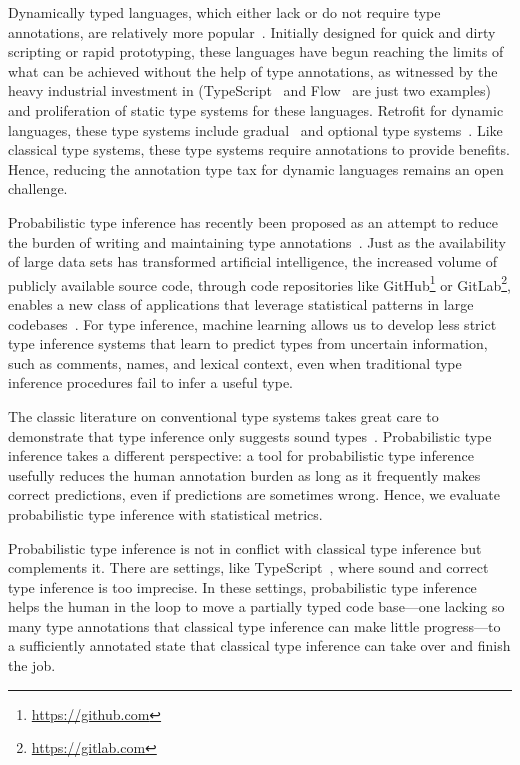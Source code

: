 \documentclass[sigplan,10pt,review,anonymous]{acmart} %
\theoremstyle{plain}
\theoremstyle{remark}
\theoremstyle{definition}
\begin{document}
Dynamically typed languages, which either lack or do not require type
annotations, are relatively more popular~\cite{meyerovich12}.  Initially
designed for quick and dirty scripting or rapid prototyping, these languages
have begun reaching the limits of what can be achieved without the help of type
annotations, as witnessed by the heavy industrial investment in
(TypeScript~\cite{typescript} and Flow~\cite{flow} are just two
examples) and proliferation of static type systems for these languages.
Retrofit for dynamic languages, these type systems include gradual~\cite{siek06}
and optional type systems~\citep{bracha2004pluggable}.  Like classical type systems, these type systems
require annotations to provide benefits.  Hence, reducing the annotation type tax
for dynamic languages remains an open challenge.

Probabilistic type inference
has recently been proposed as an attempt to reduce the burden
of writing and maintaining type
annotations~\cite{raychev15,xu16,hellendoorn18}.
Just as the availability of large data sets has transformed artificial intelligence,
the increased volume of publicly available source code, through
code repositories like GitHub\footnote{\href{https://github.com}{https://github.com}}
or GitLab\footnote{\href{https://gitlab.com}{https://gitlab.com}},
enables a new class of applications that leverage statistical
patterns in large codebases~\cite{allamanis17}.
For type inference, machine learning
allows us to develop less strict type inference systems
that learn to predict types from uncertain information,
such as comments, names, and lexical context,
even when traditional type inference procedures
fail to infer a useful type.

The classic literature on conventional type systems takes great care to demonstrate
that type inference only suggests sound types~\cite{DBLP:journals/jcss/Milner78,Pierce2002}.
Probabilistic type inference takes a different perspective:
a tool for probabilistic type inference usefully reduces the human annotation burden
as long as it frequently makes correct predictions, even if predictions are sometimes wrong.
Hence, we evaluate probabilistic type inference with statistical metrics.

Probabilistic type inference is not in conflict with classical type inference but complements it.
There are settings, like TypeScript~\cite{typescript}, where sound and correct type inference is too imprecise.
In these settings, probabilistic type inference helps the human in the loop to move a
partially typed code base---one lacking so many type annotations that classical type inference
can make little progress---to a sufficiently annotated state that classical type inference can take over and finish the job.
\end{document}
